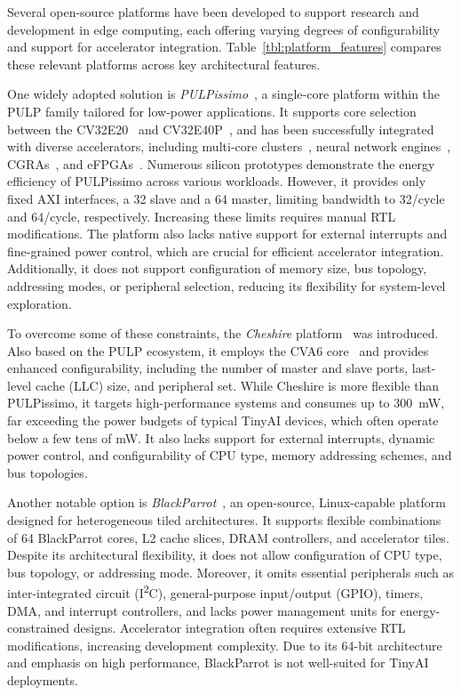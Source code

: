             Several open-source platforms have been developed to support research and development in edge computing, each offering varying degrees of configurability and support for accelerator integration. Table~\ref{tbl:platform_features} compares these relevant platforms across key architectural features.
            
            One widely adopted solution is \emph{PULPissimo}~\cite{pulpissimo}, a single-core platform within the PULP family tailored for low-power applications. It supports core selection between the CV32E20~\cite{zeroriscy} and CV32E40P~\cite{ri5cy}, and has been successfully integrated with diverse accelerators, including multi-core clusters~\cite{pulp_cluster}, neural network engines~\cite{cnn}, CGRAs~\cite{oe-cgra}, and eFPGAs~\cite{arnold}. Numerous silicon prototypes demonstrate the energy efficiency of \mbox{PULPissimo} across various workloads. However, it provides only fixed AXI interfaces, a \SI{32}{\bit} slave and a \SI{64}{\bit} master, limiting bandwidth to \SI{32}{\bit}/cycle and \SI{64}{\bit}/cycle, respectively. Increasing these limits requires manual RTL modifications. The platform also lacks native support for external interrupts and fine-grained power control, which are crucial for efficient accelerator integration. Additionally, it does not support configuration of memory size, bus topology, addressing modes, or peripheral selection, reducing its flexibility for system-level exploration.
            
            To overcome some of these constraints, the \emph{Cheshire} platform~\cite{cheshire} was introduced. Also based on the PULP ecosystem, it employs the CVA6 core~\cite{ariane} and provides enhanced configurability, including the number of master and slave ports, last-level cache (LLC) size, and peripheral set. While Cheshire is more flexible than PULPissimo, it targets high-performance systems and consumes up to \SI{300}{\milli\watt}, far exceeding the power budgets of typical TinyAI devices, which often operate below a few tens of \si{\milli\watt}. It also lacks support for external interrupts, dynamic power control, and configurability of CPU type, memory addressing schemes, and bus topologies.
            
            Another notable option is \emph{BlackParrot}~\cite{blackparrot}, an open-source, Linux-capable platform designed for heterogeneous tiled architectures. It supports flexible combinations of \SI{64}{\bit} BlackParrot cores, L2 cache slices, DRAM controllers, and accelerator tiles. Despite its architectural flexibility, it does not allow configuration of CPU type, bus topology, or addressing mode. Moreover, it omits essential peripherals such as inter-integrated circuit (I\textsuperscript{2}C), general-purpose input/output (GPIO), timers, DMA, and interrupt controllers, and lacks power management units for energy-constrained designs. Accelerator integration often requires extensive RTL modifications, increasing development complexity. Due to its 64-bit architecture and emphasis on high performance, BlackParrot is not well-suited for TinyAI deployments.
            
